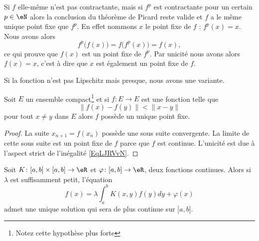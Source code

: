 \begin{remark}  \label{remIOHUJm}
    Si \( f\) elle-même n'est pas contractante, mais si \( f^p\) est contractante pour un certain \( p\in \eN\) alors la conclusion du théorème de Picard reste valide et \( f\) a le même unique point fixe que \( f^p\). En effet nommons \( x\) le point fixe de \( f\) : \( f^p(x)=x\). Nous avons alors
    \begin{equation}
        f^p\big( f(x) \big)=f\big( f^p(x) \big)=f(x),
    \end{equation}
    ce qui prouve que \( f(x)\) est un point fixe de \( f^p\). Par unicité nous avons alors \( f(x)=x\), c'est à dire que \( x\) est également un point fixe de \( f\).
\end{remark}

Si la fonction n'est pas Lipschitz mais presque, nous avons une variante.
\begin{proposition}
    Soit \( E\) un ensemble compact\footnote{Notez cette hypothèse plus forte} et si \( f\colon E\to E\) est une fonction telle que
    \begin{equation}        \label{EqLJRVvN}
        \| f(x)-f(y) \|< \| x-y \|
    \end{equation}
    pour tout \( x\neq y\) dans \( E\) alors \( f\) possède un unique point fixe.
\end{proposition}

\begin{proof}
    La suite \( x_{n+1}=f(x_n)\) possède une sous suite convergente. La limite de cette sous suite est un point fixe de \( f\) parce que \( f\) est continue. L'unicité est due à l'aspect strict de l'inégalité \eqref{EqLJRVvN}.
\end{proof}

\begin{theorem}     \label{ThoagJPZJ}
    Soit \( K\colon \mathopen[ a , b \mathclose]\times \mathopen[ a , b \mathclose]\to \eR\) et \( \varphi\colon \mathopen[ a , b \mathclose]\to \eR\), deux fonctions continues. Alors si \( \lambda\) est suffisamment petit, l'équation
    \begin{equation}
        f(x)=\lambda\int_a^bK(x,y)f(y)dy+\varphi(x)
    \end{equation}
    admet une unique solution qui sera de plus continue sur \( \mathopen[ a , b \mathclose]\).
\end{theorem}

